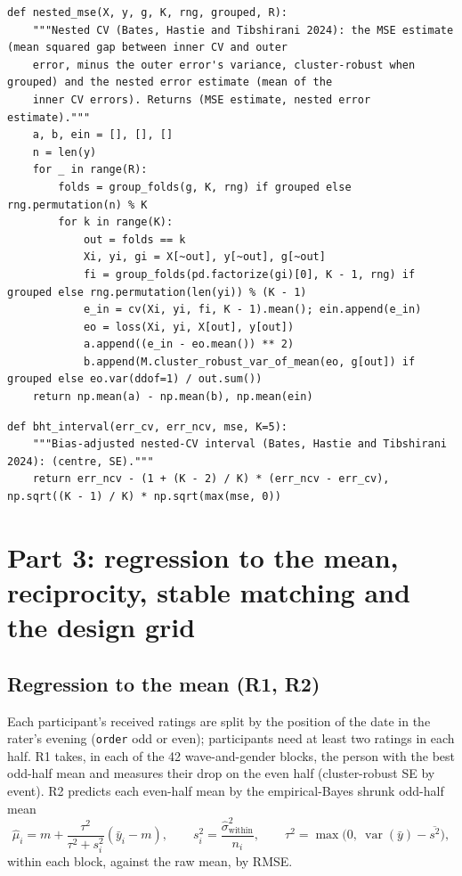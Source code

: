 \documentclass[11pt]{article}
\begin{document}
\begin{lstlisting}[caption={Nested and cluster-nested CV (scripts/sim\_cv\_matched.py)}]
def nested_mse(X, y, g, K, rng, grouped, R):
    """Nested CV (Bates, Hastie and Tibshirani 2024): the MSE estimate (mean squared gap between inner CV and outer
    error, minus the outer error's variance, cluster-robust when grouped) and the nested error estimate (mean of the
    inner CV errors). Returns (MSE estimate, nested error estimate)."""
    a, b, ein = [], [], []
    n = len(y)
    for _ in range(R):
        folds = group_folds(g, K, rng) if grouped else rng.permutation(n) % K
        for k in range(K):
            out = folds == k
            Xi, yi, gi = X[~out], y[~out], g[~out]
            fi = group_folds(pd.factorize(gi)[0], K - 1, rng) if grouped else rng.permutation(len(yi)) % (K - 1)
            e_in = cv(Xi, yi, fi, K - 1).mean(); ein.append(e_in)
            eo = loss(Xi, yi, X[out], y[out])
            a.append((e_in - eo.mean()) ** 2)
            b.append(M.cluster_robust_var_of_mean(eo, g[out]) if grouped else eo.var(ddof=1) / out.sum())
    return np.mean(a) - np.mean(b), np.mean(ein)
\end{lstlisting}

\begin{lstlisting}[caption={The bias-adjusted interval (scripts/sim\_cv\_matched.py)}]
def bht_interval(err_cv, err_ncv, mse, K=5):
    """Bias-adjusted nested-CV interval (Bates, Hastie and Tibshirani 2024): (centre, SE)."""
    return err_ncv - (1 + (K - 2) / K) * (err_ncv - err_cv), np.sqrt((K - 1) / K) * np.sqrt(max(mse, 0))
\end{lstlisting}

\section{Part 3: regression to the mean, reciprocity, stable matching and the design grid}\label{sec:part3}

\subsection{Regression to the mean (R1, R2)}

Each participant's received ratings are split by the position of the date in the rater's evening (\texttt{order}
odd or even); participants need at least two ratings in each half. R1 takes, in each of the 42 wave-and-gender blocks,
the person with the best odd-half mean and measures their drop on the even half (cluster-robust SE by event). R2
predicts each even-half mean by the empirical-Bayes shrunk odd-half mean
\[
\hat\mu_i = m + \frac{\tau^2}{\tau^2 + s_i^2}(\bar y_i - m), \qquad s_i^2 = \frac{\hat\sigma^2_{\text{within}}}{n_i}, \qquad
\tau^2 = \max\big(0,\ \operatorname{var}(\bar y) - \overline{s^2}\big),
\]
within each block, against the raw mean, by RMSE.
\end{document}
